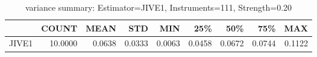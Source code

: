 \begin{table}[ht]
\centering
\caption{variance summary: Estimator=JIVE1, Instruments=111, Strength=0.20}
\begin{tabular}{lrrrrrrrr}
\toprule
 & COUNT & MEAN & STD & MIN & 25\% & 50\% & 75\% & MAX \\
\midrule
JIVE1 & 10.0000 & 0.0638 & 0.0333 & 0.0063 & 0.0458 & 0.0672 & 0.0744 & 0.1122 \\
\bottomrule
\end{tabular}
\end{table}
